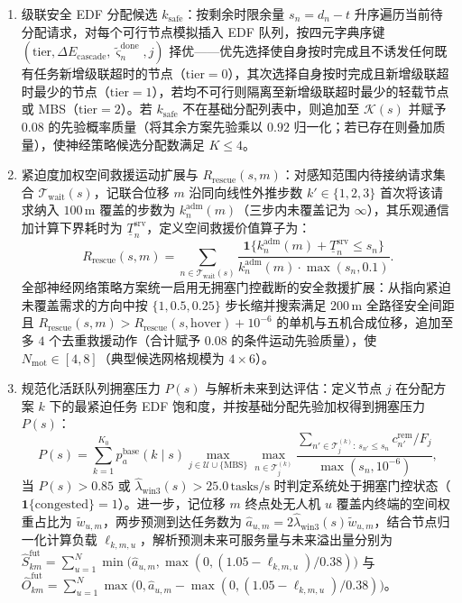 \begin{enumerate}
\item 级联安全 EDF 分配候选 $k_{\mathrm{safe}}$：按剩余时限余量 $s_n=d_n-t$ 升序遍历当前待分配请求，对每个可行节点模拟插入 EDF 队列，按四元字典序键 $(\mathrm{tier},\allowbreak \Delta E_{\mathrm{cascade}},\allowbreak \tilde{\varsigma}_n^{\mathrm{done}},\allowbreak j)$ 择优——优先选择使自身按时完成且不诱发任何既有任务新增级联超时的节点（$\mathrm{tier}=0$），其次选择自身按时完成且新增级联超时最少的节点（$\mathrm{tier}=1$），若均不可行则隔离至新增级联超时最少的轻载节点或 MBS（$\mathrm{tier}=2$）。若 $k_{\mathrm{safe}}$ 不在基础分配列表中，则追加至 $\mathcal{K}(s)$ 并赋予 $0.08$ 的先验概率质量（将其余方案先验乘以 $0.92$ 归一化；若已存在则叠加质量），使神经策略候选分配数满足 $K\leq 4$。
\item 紧迫度加权空间救援运动扩展与 $R_{\mathrm{rescue}}(s,m)$：对感知范围内待接纳请求集合 $\mathcal{T}_{\mathrm{wait}}(s)$，记联合位移 $m$ 沿同向线性外推步数 $k'\in\{1,2,3\}$ 首次将该请求纳入 $100\,\mathrm{m}$ 覆盖的步数为 $k_n^{\mathrm{adm}}(m)$（三步内未覆盖记为 $\infty$），其乐观通信加计算下界耗时为 $\underline{T}_n^{\mathrm{srv}}$，定义空间救援价值算子为：
\begin{equation}
 R_{\mathrm{rescue}}(s,m)=\sum_{n\in\mathcal{T}_{\mathrm{wait}}(s)}
 \frac{\mathbf{1}\big\{k_n^{\mathrm{adm}}(m)+\underline{T}_n^{\mathrm{srv}}\leq s_n\big\}}
 {k_n^{\mathrm{adm}}(m)\cdot\max(s_n,0.1)}.
 \label{eq:ch5-rescue-value}
\end{equation}
全部神经网络策略方案统一启用无拥塞门控截断的安全救援扩展：从指向紧迫未覆盖需求的方向中按 $\{1,0.5,0.25\}$ 步长缩并搜索满足 $200\,\mathrm{m}$ 全路径安全间距且 $R_{\mathrm{rescue}}(s,m)>R_{\mathrm{rescue}}(s,\mathrm{hover})+10^{-6}$ 的单机与五机合成位移，追加至多 $4$ 个去重救援动作（合计赋予 $0.08$ 的条件运动先验质量），使 $N_{\mathrm{mot}}\in[4,8]$（典型候选网格规模为 $4\times 6$）。
\item 规范化活跃队列拥塞压力 $P(s)$ 与解析未来到达评估：定义节点 $j$ 在分配方案 $k$ 下的最紧迫任务 EDF 饱和度，并按基础分配先验加权得到拥塞压力 $P(s)$：
\begin{equation}
 P(s)=\sum_{k=1}^{K_0}p_a^{\mathrm{base}}(k\mid s)\max_{j\in\mathcal{U}\cup\{\mathrm{MBS}\}}\max_{n\in\mathcal{T}_j^{(k)}}
 \frac{\sum_{n'\in\mathcal{T}_j^{(k)}:\,s_{n'}\leq s_n}c_{n'}^{\mathrm{rem}}/F_j}{\max(s_n,10^{-6})},
 \label{eq:ch5-congestion-pressure}
\end{equation}
当 $P(s)>0.85$ 或 $\hat{\lambda}_{\mathrm{win3}}(s)>\allowbreak 25.0\,\mathrm{tasks/s}$ 时判定系统处于拥塞门控状态（\allowbreak$\mathbf{1}\{\mathrm{congested}\}\allowbreak =\allowbreak 1$）。进一步，记位移 $m$ 终点处无人机 $u$ 覆盖内终端的空间权重占比为 $\tilde{w}_{u,m}$，两步预测到达任务数为 $\hat{a}_{u,m}=\allowbreak 2\hat{\lambda}_{\mathrm{win3}}(s)\allowbreak\tilde{w}_{u,m}$，结合节点归一化计算负载 $\ell_{k,m,u}$，解析预测未来可服务量与未来溢出量分别为 $\widehat{S}_{km}^{\mathrm{fut}}=\allowbreak\sum_{u=1}^N\allowbreak\min\big(\hat{a}_{u,m},\allowbreak\max(0,\allowbreak(1.05-\ell_{k,m,u})/0.38)\big)$ 与 $\widehat{O}_{km}^{\mathrm{fut}}=\allowbreak\sum_{u=1}^N\allowbreak\max\big(0,\allowbreak\hat{a}_{u,m}-\allowbreak\max(0,\allowbreak(1.05-\ell_{k,m,u})/0.38)\big)$。
\end{enumerate}
